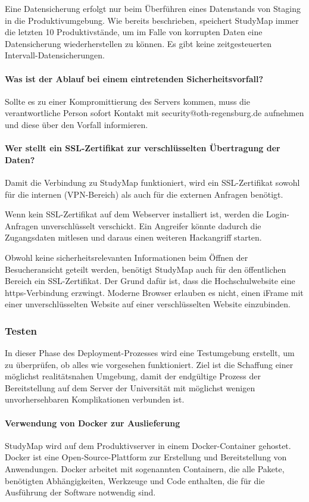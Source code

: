 Eine Datensicherung erfolgt nur beim Überführen eines Datenstands von Staging in die Produktivumgebung. Wie bereits beschrieben, speichert StudyMap immer die letzten 10 Produktivstände, um im Falle von korrupten Daten eine Datensicherung wiederherstellen zu können. Es gibt keine zeitgesteuerten Intervall-Datensicherungen.

\paragraph*{Was ist der Ablauf bei einem eintretenden Sicherheitsvorfall?}
Sollte es zu einer Kompromittierung des Servers kommen, muss die verantwortliche Person sofort Kontakt mit security@oth-regensburg.de aufnehmen und diese über den Vorfall informieren.

\paragraph*{Wer stellt ein SSL-Zertifikat zur verschlüsselten Übertragung der Daten?}
Damit die Verbindung zu StudyMap funktioniert, wird ein SSL-Zertifikat sowohl für die internen (VPN-Bereich) als auch für die externen Anfragen benötigt.

Wenn kein SSL-Zertifikat auf dem Webserver installiert ist, werden die Login-Anfragen unverschlüsselt verschickt. Ein Angreifer könnte dadurch die Zugangsdaten mitlesen und daraus einen weiteren Hackangriff starten.

Obwohl keine sicherheitsrelevanten Informationen beim Öffnen der Besucheransicht geteilt werden, benötigt StudyMap auch für den öffentlichen Bereich ein SSL-Zertifikat. Der Grund dafür ist, dass die Hochschulwebsite eine https-Verbindung erzwingt. Moderne Browser erlauben es nicht, einen iFrame mit einer unverschlüsselten Website auf einer verschlüsselten Website einzubinden. \parencite{vyas_mixed_2013}

\subsubsection{Testen}
In dieser Phase des Deployment-Prozesses wird eine Testumgebung erstellt, um zu überprüfen, ob alles wie vorgesehen funktioniert. Ziel ist die Schaffung einer möglichst realitätsnahen Umgebung, damit der endgültige Prozess der Bereitstellung auf dem Server der Universität mit möglichst wenigen unvorhersehbaren Komplikationen verbunden ist.

\paragraph*{Verwendung von Docker zur Auslieferung}
StudyMap wird auf dem Produktivserver in einem Docker-Container gehostet. Docker ist eine Open-Source-Plattform zur Erstellung und Bereitstellung von Anwendungen. Docker arbeitet mit sogenannten Containern, die alle Pakete, benötigten Abhängigkeiten, Werkzeuge und Code enthalten, die für die Ausführung der Software notwendig sind. \parencite{amazon_web_services_inc_was_2023}

